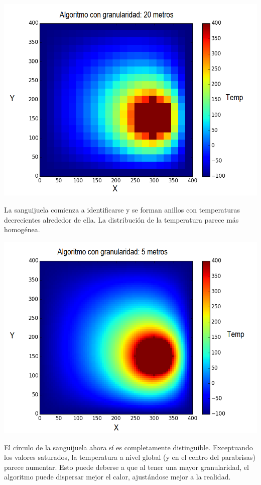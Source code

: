 	\begin{center}
		\includegraphics[scale=0.5]{./img/granularidad/g20_t400_sinkill.png}
	\end{center}

	La sanguijuela comienza a identificarse y se forman anillos con temperaturas decrecientes alrededor de ella. La distribución de la temperatura parece más homogénea.

	\begin{center}
		\includegraphics[scale=0.5]{./img/granularidad/g5_t400_sinkill.png}
	\end{center}

	El círculo de la sanguijuela ahora sí es completamente distinguible. Exceptuando los valores saturados, la temperatura a nivel global (y en el centro del parabrisas) parece aumentar. Esto puede deberse a que al tener una mayor granularidad, el algoritmo puede dispersar mejor el calor, ajustándose mejor a la realidad.


